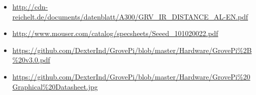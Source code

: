 \documentclass{report}
\begin{document}
\begin{itemize}

\item \url{http://cdn-reichelt.de/documents/datenblatt/A300/GRV_IR_DISTANCE_AL-EN.pdf}

\item \url{http://www.mouser.com/catalog/specsheets/Seeed_101020022.pdf}

\item \url{https://github.com/DexterInd/GrovePi/blob/master/Hardware/GrovePi%2B%20v3.0.pdf}

\item \url{https://github.com/DexterInd/GrovePi/blob/master/Hardware/GrovePi%20Graphical%20Datasheet.jpg}

\end{itemize}
\end{document}
